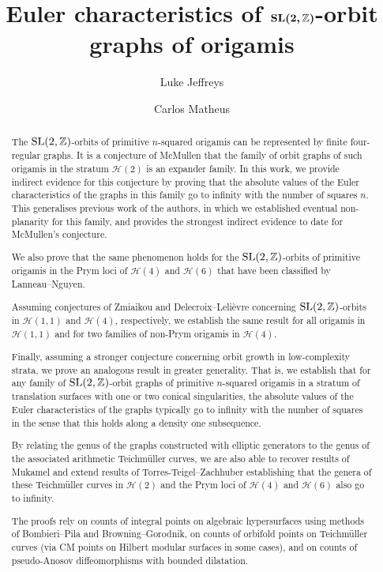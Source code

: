 \documentclass[a4paper,11pt]{amsart}
\author{Luke Jeffreys}
\author{Carlos Matheus}
\title[Euler characteristics of $\SL(2,\Z)$-orbit graphs of origamis]{Euler characteristics of $\boldsymbol{\SL(2,\Z)}$-orbit graphs of origamis}
\numberwithin{equation}{section}
\numberwithin{figure}{section}
\numberwithin{table}{section}
\newcommand{\teichmuller}{Teichm{\"u}ller }
\newcommand{\calH}{\mathcal{H}}
\newcommand{\Z}{\mathbb{Z}}
\DeclareMathOperator{\SL}{{\rm{SL}}}
\begin{document}
\begin{abstract}
    The $\SL(2,\Z)$-orbits of primitive $n$-squared origamis can be represented by finite four-regular graphs. It is a conjecture of McMullen that the family of orbit graphs of such origamis in the stratum $\calH(2)$ is an expander family. In this work, we provide indirect evidence for this conjecture by proving that the absolute values of the Euler characteristics of the graphs in this family go to infinity with the number of squares $n$. This generalises previous work of the authors, in which we established eventual non-planarity for this family, and provides the strongest indirect evidence to date for McMullen's conjecture.

    We also prove that the same phenomenon holds for the $\SL(2,\Z)$-orbits of primitive origamis in the Prym loci of $\calH(4)$ and $\calH(6)$ that have been classified by Lanneau--Nguyen.
    
    Assuming conjectures of Zmiaikou and Delecroix--Leli\`evre concerning $\SL(2,\Z)$-orbits in $\calH(1,1)$ and $\calH(4)$, respectively, we establish the same result for all origamis in $\calH(1,1)$ and for two families of non-Prym origamis in $\calH(4)$.

    Finally, assuming a stronger conjecture concerning orbit growth in low-complexity strata, we prove an analogous result in greater generality. That is, we establish that for any family of $\SL(2,\Z)$-orbit graphs of primitive $n$-squared origamis in a stratum of translation surfaces with one or two conical singularities, the absolute values of the Euler characteristics of the graphs typically go to infinity with the number of squares in the sense that this holds along a density one subsequence.

    By relating the genus of the graphs constructed with elliptic generators to the genus of the associated arithmetic \teichmuller curves, we are also able to recover results of Mukamel and extend results of Torres-Teigel--Zachhuber establishing that the genera of these \teichmuller curves in $\calH(2)$ and the Prym loci of $\calH(4)$ and $\calH(6)$ also go to infinity.

    The proofs rely on counts of integral points on algebraic hypersurfaces using methods of Bombieri--Pila and Browning--Gorodnik, on counts of orbifold points on Teichm\"uller curves (via CM points on Hilbert modular surfaces in some cases), and on counts of pseudo-Anosov diffeomorphisms with bounded dilatation.
\end{abstract}
\end{document}
